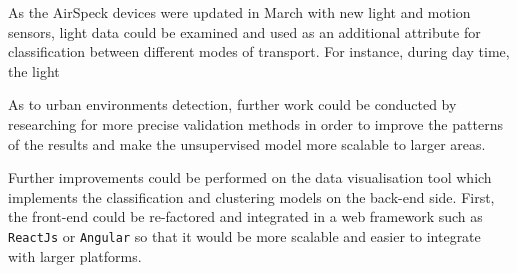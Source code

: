 \documentclass[bsc,frontabs,twoside,singlespacing, parskip,deptreport]{infthesis}     %
\begin{document}
As the AirSpeck devices were updated in March with new light and motion sensors, light data could be examined and used as an additional attribute for classification between different modes of transport. For instance, during day time, the light

As to urban environments detection, further work could be conducted by researching for more precise validation methods in order to improve the patterns of the results and make the unsupervised model more scalable to larger areas.

Further improvements could be performed on the data visualisation tool which implements the classification and clustering models on the back-end side. First, the front-end could be re-factored and integrated in a web framework such as \texttt{ReactJs} \cite{angular} or \texttt{Angular} \cite{angular} so that it would be more scalable and easier to integrate with larger platforms.






\end{document}
